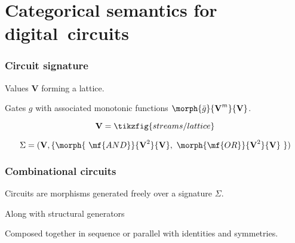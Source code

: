 \section{Categorical semantics for digital~circuits}

\begin{frame}
    \frametitle{Circuit signature}

    \pause

    \alert{Values} $\textbf{V}$ forming a lattice.

    \pause

    \alert{Gates} $g$ with associated monotonic functions $\morph{\bar{g}}{\textbf{V}^m}{\textbf{V}}$.


    \pause

    \[\textbf{V} = \tikzfig{streams/lattice}\]

    \pause

    \[\Sigma = (\textbf{V}, \{\morph{\ \mf{AND}}{\textbf{V}^2}{\textbf{V}},\ \morph{\mf{OR}}{\textbf{V}^2}{\textbf{V}}\ \})\]

\end{frame}

\begin{frame}
    \frametitle{Combinational circuits}

    \pause

    Circuits are morphisms generated freely over a signature $\Sigma$.

    \pause

    \begin{center}

        \pause

        \vspace{1em}

    \end{center}

    \vspace{1em}

    \pause

    Along with \alert{structural} generators 

    \begin{center}
        \quad
        \quad
    \end{center}

    Composed together in sequence or parallel with identities and symmetries.

\end{frame}

